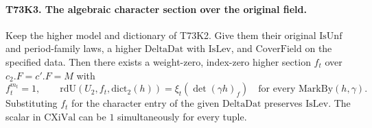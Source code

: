\paragraph{T73K3. The algebraic character section over the original field.}
\label{claim:T73K3}
Keep the higher model and dictionary of T73K2. Give them their
original $\mathrm{IsUnf}$ and period-family laws, a higher
$\mathrm{DeltaDat}$ with $\mathrm{IsLev}$, and $\mathrm{CoverField}$
on the specified data. Then there exists a weight-zero, index-zero
higher section $f_t$ over $c_2.F=c'.F=M$ with
\[
 f_t^{m_t}=1,\qquad
 \mathrm{rdU}(U_2,f_t,\mathrm{dict}_2(h))
       =\xi_t(\det(\gamma h)_f)
 \quad\text{for every }\mathrm{MarkBy}(h,\gamma).
 \tag{T73.2}
\]
Substituting $f_t$ for the character entry of the given
$\mathrm{DeltaDat}$ preserves $\mathrm{IsLev}$. The scalar in
$\mathrm{CXiVal}$ can be $1$ simultaneously for every tuple.

